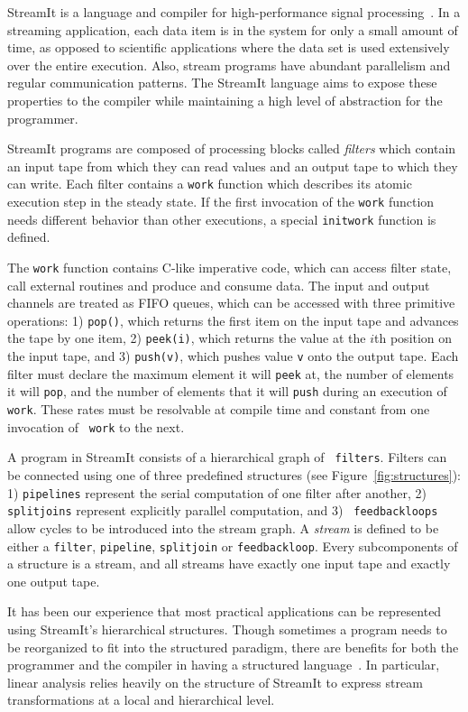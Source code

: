 StreamIt is a language and compiler for high-performance signal
processing~\cite{gordon-thesis,streamit-asplos,streamitcc}.  In a
streaming application, each data item is in the system for only a
small amount of time, as opposed to scientific applications where the
data set is used extensively over the entire execution.  Also, stream
programs have abundant parallelism and regular communication patterns.
The StreamIt language aims to expose these properties to the compiler
while maintaining a high level of abstraction for the programmer.

StreamIt programs are composed of processing blocks called {\it
filters} which contain an input tape from which they can read values
and an output tape to which they can write. Each filter contains
a {\tt work} function which describes its atomic execution step in the
steady state. If the first invocation of the {\tt work} function needs
different behavior than other executions, a special {\tt initwork} 
function is defined.

The {\tt work} function contains C-like imperative
code, which can access filter state, call external routines and
produce and consume data.  The input and output channels are treated
as FIFO queues, which can be accessed with three primitive operations:
1) {\tt pop()}, which returns the first item on the input tape and
advances the tape by one item, 2) {\tt peek(i)}, which returns the
value at the $i$th position on the input tape, and 3) {\tt push(v)},
which pushes value {\tt v} onto the output tape.  Each filter
must declare the maximum element it will {\tt peek} at, the number of
elements it will {\tt pop}, and the number of elements that it will
{\tt push} during an execution of {\tt work}.  These rates must be
resolvable at compile time and constant from one invocation of {\tt
work} to the next. 

A program in StreamIt consists of a hierarchical graph of {\tt
filters}.  Filters can be connected using one of three predefined
structures (see Figure~\ref{fig:structures}): 1) {\tt pipelines}
represent the serial computation of one filter after another, 2) {\tt
splitjoins} represent explicitly parallel computation, and 3) {\tt
feedbackloops} allow cycles to be introduced into the stream graph.
A {\it stream} is defined to be either a {\tt filter}, {\tt pipeline}, 
{\tt splitjoin} or {\tt feedbackloop}. Every subcomponents of a structure 
is a stream, and all streams have
exactly one input tape and exactly one output tape.

It has been our experience that most practical applications can be
represented using StreamIt's hierarchical structures.  Though
sometimes a program needs to be reorganized to fit into the structured
paradigm, there are benefits for both the programmer and the compiler
in having a structured language~\cite{streamitcc}.  In particular,
linear analysis relies heavily on the structure of StreamIt to express
stream transformations at a local and hierarchical level.
